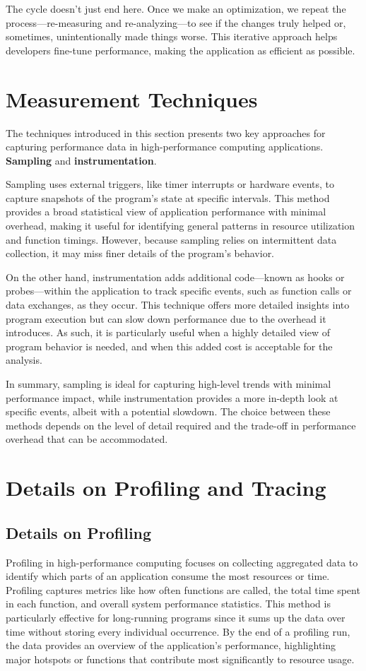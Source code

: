 \documentclass[conference]{IEEEtran}
\begin{document}
The cycle doesn’t just end here. Once we make an optimization, we repeat the process—re-measuring and re-analyzing—to see if the changes truly helped or, sometimes, unintentionally made things worse. This iterative approach helps developers fine-tune performance, making the application as efficient as possible.



\section{Measurement Techniques}

The techniques introduced in this section presents two key approaches for capturing performance data in high-performance computing applications. \textbf{Sampling} and \textbf{instrumentation}.

Sampling uses external triggers, like timer interrupts or hardware events, to capture snapshots of the program’s state at specific intervals. This method provides a broad statistical view of application performance with minimal overhead, making it useful for identifying general patterns in resource utilization and function timings. However, because sampling relies on intermittent data collection, it may miss finer details of the program’s behavior.

On the other hand, instrumentation adds additional code—known as hooks or probes—within the application to track specific events, such as function calls or data exchanges, as they occur. This technique offers more detailed insights into program execution but can slow down performance due to the overhead it introduces. As such, it is particularly useful when a highly detailed view of program behavior is needed, and when this added cost is acceptable for the analysis.

In summary, sampling is ideal for capturing high-level trends with minimal performance impact, while instrumentation provides a more in-depth look at specific events, albeit with a potential slowdown. The choice between these methods depends on the level of detail required and the trade-off in performance overhead that can be accommodated.

\section{Details on Profiling and Tracing}

\subsection{Details on Profiling}
Profiling in high-performance computing focuses on collecting aggregated data to identify which parts of an application consume the most resources or time. Profiling captures metrics like how often functions are called, the total time spent in each function, and overall system performance statistics. This method is particularly effective for long-running programs since it sums up the data over time without storing every individual occurrence. By the end of a profiling run, the data provides an overview of the application's performance, highlighting major hotspots or functions that contribute most significantly to resource usage.
\end{document}
